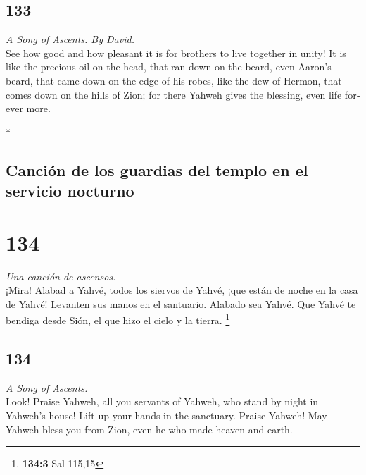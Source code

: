 \begin{paracol}{2}
\switchcolumn
\begin{otherlanguage}{english}

\hypertarget{section-265}{%
\section{133}\label{section-265}}

\emph{A Song of Ascents. By David.}\\
 See how good and how pleasant it is for brothers to live
together in unity!  It is like the precious oil on the
head, that ran down on the beard, even Aaron's beard, that came down on
the edge of his robes,  like the dew of Hermon, that comes
down on the hills of Zion; for there Yahweh gives the blessing, even
life forever more.

\end{otherlanguage}

\switchcolumn[0]*

\hypertarget{canciuxf3n-de-los-guardias-del-templo-en-el-servicio-nocturno}{%
\subsection{Canción de los guardias del templo en el servicio
nocturno}\label{canciuxf3n-de-los-guardias-del-templo-en-el-servicio-nocturno}}

\hypertarget{section-266}{%
\section{134}\label{section-266}}

\emph{Una canción de ascensos.}\\
 ¡Mira! Alabad a Yahvé, todos los siervos de Yahvé, ¡que
están de noche en la casa de Yahvé!  Levanten sus manos en
el santuario. Alabado sea Yahvé.  Que Yahvé te bendiga
desde Sión, el que hizo el cielo y la tierra. \footnote{\textbf{134:3}
  Sal 115,15}

\switchcolumn
\begin{otherlanguage}{english}

\hypertarget{section-267}{%
\section{134}\label{section-267}}

\emph{A Song of Ascents.}\\
 Look! Praise Yahweh, all you servants of Yahweh, who
stand by night in Yahweh's house!  Lift up your hands in
the sanctuary. Praise Yahweh!  May Yahweh bless you from
Zion, even he who made heaven and earth.


\end{otherlanguage}
\end{paracol}
